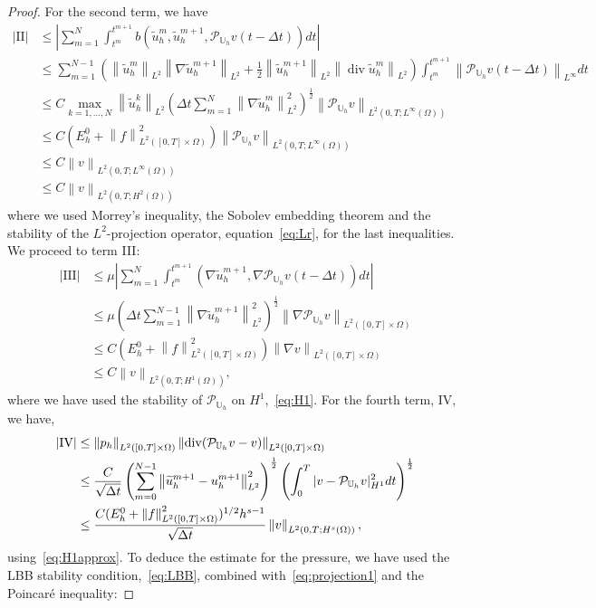 \documentclass[10pt,letterpaper]{amsart}
\newcommand{\tu}{\widetilde{u}}
\newcommand\norm[1]{\left\lVert#1\right\rVert}
\newcommand{\Grad}{\nabla}
\newcommand{\Div}{\operatorname{div}}
\newcommand{\dom}{\Omega}
\newcommand{\Uh}{\mathbb{U}_h}
\newcommand{\PUh}{\mathcal{P}_{\Uh}}
\theoremstyle{definition}{\newtheorem{definition}[lemma]{Definition}}
\numberwithin{equation}{section}
\begin{document}
\begin{proof}
	For the second term, we have
	\begin{align*}
		|\text{II}|&\leq \left| \sum_{m=1}^{N} \int_{t^m}^{t^{m+1}}b(\tu_h^m,\tu_h^{m+1},\PUh v(t-\Delta t))dt\right|\\
		& \leq \sum_{m=1}^{N-1} \left(\norm{\tu^m_h}_{L^2} \norm{\Grad\tu_h^{m+1}}_{L^2}+\frac12\norm{\tu^{m+1}_h}_{L^2} \norm{\Div\tu_h^{m}}_{L^2}\right)\int_{t^m}^{t^{m+1}}\norm{\PUh v(t-\Delta t)}_{L^\infty}dt\\
		& \leq C\max_{k=1,\dots,N}\norm{\tu^k_h}_{L^2}\left(\Delta t \sum_{m=1}^{N}\norm{\Grad\tu_h^{m}}_{L^2}^2\right)^{\frac12}\norm{\PUh v}_{L^2(0,T;L^\infty(\dom))}\\
		&\leq C (E_h^0+ \norm{f}^2_{L^2([0,T]\times\dom)})	\norm{\PUh v}_{L^2(0,T;L^\infty(\dom))}\\
		&\leq C	\norm{v}_{L^2(0,T;L^\infty(\dom))}\\
		&\leq C	\norm{v}_{L^2(0,T;H^2(\dom))}
	\end{align*}
	where we used Morrey's inequality, the Sobolev embedding theorem and the stability of the $L^2$-projection operator, equation~\eqref{eq:Lr}, for the last inequalities. 
	We proceed to term III:
	\begin{align*}
		|\text{III}|& \leq \mu \left|\sum_{m=1}^{N }\int_{t^m}^{t^{m+1}}(\Grad \tu^{m+1}_h,\Grad\PUh v(t-\Delta t))dt  \right|\\
		& \leq\mu \left(\Delta t \sum_{m=1}^{N-1}\norm{\Grad \tu^{m+1}_h}_{L^2}^2\right)^{\frac12}\norm{\Grad\PUh v}_{L^2([0,T]\times\dom)}\\
		&\leq C (E_h^0 	+\norm{f}_{L^2([0,T]\times\dom)}^2)\norm{\Grad v}_{L^2([0,T]\times\dom)}\\
		&\leq C \norm{v}_{L^2(0,T;H^1(\dom))},	
	\end{align*}
	where we have used the stability of $\PUh$ on $H^1$,~\eqref{eq:H1}. 
 	For the fourth term, IV, we have,
	\begin{align}\label{eq:pressuretimecont}
		|\text{IV}|&\leq \norm{p_h}_{L^2([0,T]\times \dom)}\norm{\Div(\PUh v-v)}_{L^2([0,T]\times\dom)}\\
		& \leq \frac{C}{\sqrt{\Delta t}}\left(\sum_{m=0}^{N-1}\norm{\tu^{m+1}_h-u^{m+1}_h}_{L^2}^2\right)^{\frac12}\left(\int_0^T|v-\PUh v|_{H^1}^2 dt\right)^{\frac12}\notag\\
		&\leq \frac{C (E_h^0+\norm{f}_{L^2([0,T]\times\dom)}^2)^{1/2} h^{s-1}}{\sqrt{\Delta t}}\norm{v}_{L^2(0,T;H^s(\dom))},\notag
	\end{align}
	using~\eqref{eq:H1approx}.
	To deduce the estimate for the pressure, we have used the LBB stability condition,~\eqref{eq:LBB}, combined with~\eqref{eq:projection1} and the Poincar\'e inequality:

\end{proof}
\end{document}
